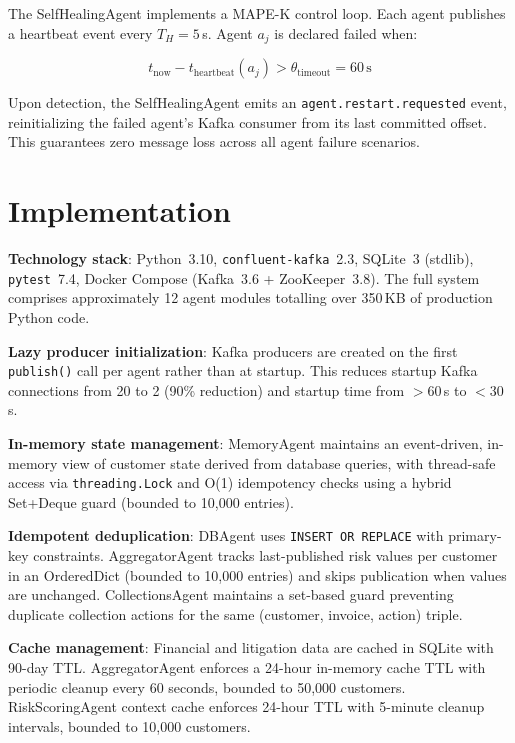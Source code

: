 ﻿\documentclass[runningheads]{llncs}
\begin{document}
The SelfHealingAgent implements a MAPE-K control loop. Each agent publishes a heartbeat event every $T_H=5$\,s. Agent $a_j$ is declared failed when:

\begin{equation}
t_{\text{now}} - t_{\text{heartbeat}}(a_j) > \theta_{\text{timeout}} = 60\,\text{s}
\label{eq:heartbeat}
\end{equation}

Upon detection, the SelfHealingAgent emits an \texttt{agent.restart.requested} event, reinitializing the failed agent's Kafka consumer from its last committed offset. This guarantees zero message loss across all agent failure scenarios.

\section{Implementation}
\label{sec:implementation}

\textbf{Technology stack}: Python~3.10, \texttt{confluent-kafka}~2.3, SQLite~3 (stdlib), \texttt{pytest}~7.4, Docker Compose (Kafka~3.6 + ZooKeeper~3.8). The full system comprises approximately 12 agent modules totalling over 350\,KB of production Python code.

\textbf{Lazy producer initialization}: Kafka producers are created on the first \texttt{publish()} call per agent rather than at startup. This reduces startup Kafka connections from 20 to 2 (90\% reduction) and startup time from $>60$\,s to $<30$\,s.

\textbf{In-memory state management}: MemoryAgent maintains an event-driven, in-memory view of customer state derived from database queries, with thread-safe access via \texttt{threading.Lock} and O(1) idempotency checks using a hybrid Set+Deque guard (bounded to 10,000 entries).

\textbf{Idempotent deduplication}: DBAgent uses \texttt{INSERT OR\allowbreak\ REPLACE} with primary-key constraints. AggregatorAgent tracks last-published risk values per customer in an OrderedDict (bounded to 10,000 entries) and skips publication when values are unchanged. CollectionsAgent maintains a set-based guard preventing duplicate collection actions for the same (customer, invoice, action) triple.

\textbf{Cache management}: Financial and litigation data are cached in SQLite with 90-day TTL. AggregatorAgent enforces a 24-hour in-memory cache TTL with periodic cleanup every 60 seconds, bounded to 50,000 customers. RiskScoringAgent context cache enforces 24-hour TTL with 5-minute cleanup intervals, bounded to 10,000 customers.
\end{document}
